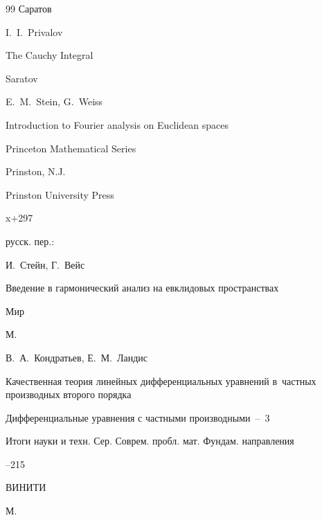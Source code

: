\begin{thebibliography}{99}
\publaddr Саратов



\misctransl 

\by I.~I.~Privalov

\book The Cauchy Integral

\publaddr Saratov










\by E.~M.~Stein, G.~Weiss

\book Introduction to Fourier analysis on Euclidean spaces

\serial Princeton Mathematical Series


\publaddr Prinston, N.J.

\publ Prinston University Press


\totalpages x+297

\rtransl русск. пер.:~

\by И.~Стейн, Г.~Вейс 

\book Введение в гармонический анализ на евклидовых пространствах

\publ Мир

\publaddr М.










\by В.~А.~Кондратьев, Е.~М.~Ландис

\paper Качественная теория линейных дифференциальных уравнений в~частных производных второго порядка

\inbook Дифференциальные уравнения с частными производными~--~3

\serial Итоги науки и техн. Сер. Соврем. пробл. мат. Фундам. направления



--215

\publ ВИНИТИ

\publaddr М.



\end{thebibliography}
